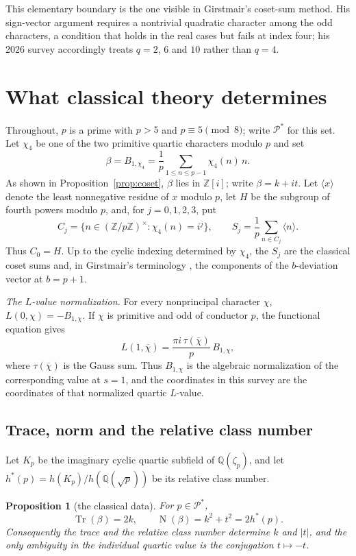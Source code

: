 \documentclass[11pt,reqno]{amsart}
\theoremstyle{plain}
\newtheorem{proposition}[theorem]{Proposition}
\theoremstyle{definition}
\newcommand{\Z}{\mathbb{Z}}
\newcommand{\Q}{\mathbb{Q}}
\DeclareMathOperator{\Tr}{Tr}
\DeclareMathOperator{\Nm}{N}
\newcommand{\Pstar}{\mathcal P^*}
\begin{document}
This elementary boundary is the one visible in Girstmair's coset-sum method. His sign-vector argument
\cite{GirAbh} requires a nontrivial quadratic character among the odd characters, a condition that holds in
the real cases but fails at index four; his 2026 survey \cite{GirSurv} accordingly treats $q=2$, $6$ and $10$
rather than $q=4$.

\section{What classical theory determines}\label{sec:classical}

Throughout, $p$ is a prime with $p>5$ and $p\equiv5\pmod8$; write $\Pstar$ for this set. Let $\chi_4$ be one of the
two primitive quartic characters modulo $p$ and set
\[
\beta=B_{1,\chi_4}=\frac1p\sum_{1\le n\le p-1}\chi_4(n)\,n.
\]
As shown in Proposition~\ref{prop:coset}, $\beta$ lies in $\Z[i]$; write $\beta=k+it$. Let $\langle x\rangle$
denote the least nonnegative residue of $x$ modulo $p$, let $H$ be the subgroup of fourth powers modulo $p$, and,
for $j=0,1,2,3$, put
\[
C_j=\{n\in(\Z/p\Z)^\times:\chi_4(n)=i^j\},\qquad S_j=\frac1p\sum_{n\in C_j}\langle n\rangle .
\]
Thus $C_0=H$. Up to the cyclic indexing determined by $\chi_4$, the $S_j$ are the classical coset sums and, in
Girstmair's terminology \cite{GirAbh}, the components of the $b$-deviation vector at $b=p+1$.

\emph{The $L$-value normalization.} For every nonprincipal character $\chi$, $L(0,\chi)=-B_{1,\chi}$. If $\chi$
is primitive and odd of conductor $p$, the functional equation gives
\[
L(1,\overline\chi)=\frac{\pi i\,\tau(\overline\chi)}p\,B_{1,\chi},
\]
where $\tau(\overline\chi)$ is the Gauss sum. Thus $B_{1,\chi}$ is the algebraic normalization of the
corresponding value at $s=1$, and the coordinates in this survey are the coordinates of that normalized quartic
$L$-value.

\subsection{Trace, norm and the relative class number}
Let $K_p$ be the imaginary cyclic quartic subfield of $\Q(\zeta_p)$, and let $h^*(p)=h(K_p)/h(\Q(\sqrt p))$ be its
relative class number.

\begin{proposition}[the classical data]\label{prop:data}
For $p\in\Pstar$,
\begin{equation}\label{eq:trnorm}
\Tr(\beta)=2k,\qquad\Nm(\beta)=k^2+t^2=2h^*(p).
\end{equation}
Consequently the trace and the relative class number determine $k$ and $|t|$, and the only ambiguity in the
individual quartic value is the conjugation $t\mapsto-t$.
\end{proposition}
\end{document}

